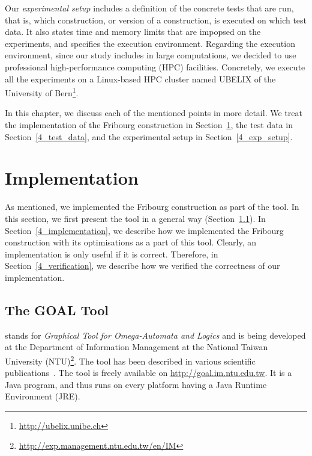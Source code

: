 Our \textit{experimental setup} includes a definition of the concrete tests that are run, that is, which construction, or version of a construction, is executed on which test data. It also states time and memory limits that are impopsed on the experiments, and specifies the execution environment. Regarding the execution environment, since our study includes in large computations, we decided to use professional high-performance computing (HPC) facilities. Concretely, we execute all the experiments on a Linux-based HPC cluster named UBELIX of the University of Bern\footnote{\url{http://ubelix.unibe.ch}}.


In this chapter, we discuss each of the mentioned points in more detail. We treat the implementation of the Fribourg construction in Section~\ref{4_impl}, the test data in Section~\ref{4_test_data}, and the experimental setup in Section~\ref{4_exp_setup}.


\section{Implementation}
\label{4_impl}
As mentioned, we implemented the Fribourg construction as part of the \goal{} tool. In this section, we first present the \goal{} tool in a general way (Section~\ref{4_goal}). In Section~\ref{4_implementation}, we describe how we implemented the Fribourg construction with its optimisations as a part of this tool. Clearly, an implementation is only useful if it is correct. Therefore, in Section~\ref{4_verification}, we describe how we verified the correctness of our implementation.


\subsection{The GOAL Tool}
\label{4_goal}
\goal{} stands for \textit{Graphical Tool for Omega-Automata and Logics} and is being developed at the Department of Information Management at the National Taiwan University (NTU)\footnote{\url{http://exp.management.ntu.edu.tw/en/IM}}. The tool has been described in various scientific publications~\cite{2007_goal,2008_goal_ext,2009_goal,2013_goal}. The \goal{} tool is freely available on \url{http://goal.im.ntu.edu.tw}. It is a Java program, and thus runs on every platform having a Java Runtime Environment (JRE).

